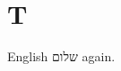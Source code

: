\documentclass{closettwin}
\begin{document}
\mainmatter
\chapter{T}
English \foreignlanguage{hebrew}{שלום} again.
\end{document}
